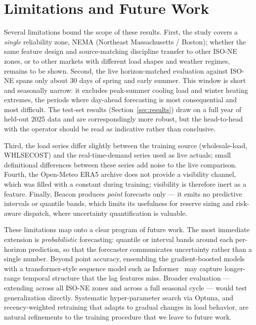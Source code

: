 \section{Limitations and Future Work}\label{sec:limits}

Several limitations bound the scope of these results. First, the study covers a
\emph{single} reliability zone, NEMA (Northeast Massachusetts / Boston); whether the
same feature design and source-matching discipline transfer to other ISO-NE zones, or
to other markets with different load shapes and weather regimes, remains to be shown.
Second, the live horizon-matched evaluation against ISO-NE spans only about $30$ days
of spring and early summer. This window is short and seasonally narrow: it excludes
peak-summer cooling load and winter heating extremes, the periods where day-ahead
forecasting is most consequential and most difficult. The test-set results
(Section~\ref{sec:results}) draw on a full year of held-out 2025 data and are
correspondingly more robust, but the head-to-head with the operator should be read as
indicative rather than conclusive.

Third, the load series differ slightly between the training source (wholesale-load,
WHLSECOST) and the real-time-demand series used as live actuals; small definitional
differences between these series add noise to the live comparison. Fourth, the
Open-Meteo ERA5 archive does not provide a visibility channel, which was filled with a
constant during training; visibility is therefore inert as a feature. Finally, Beacon
produces \emph{point} forecasts only --- it emits no predictive intervals or quantile
bands, which limits its usefulness for reserve sizing and risk-aware dispatch, where
uncertainty quantification is valuable.

These limitations map onto a clear program of future work. The most immediate
extension is \emph{probabilistic} forecasting: quantile or interval bands around each
per-horizon prediction, so that the forecaster communicates uncertainty rather than a
single number. Beyond point accuracy, ensembling the gradient-boosted models with a
transformer-style sequence model such as Informer~\cite{zhou2021informer} may capture
longer-range temporal structure that the lag features miss. Broader evaluation ---
extending across all ISO-NE zones and across a full seasonal cycle --- would test
generalization directly. Systematic hyper-parameter search via Optuna, and
recency-weighted retraining that adapts to gradual changes in load behavior, are
natural refinements to the training procedure that we leave to future work.
